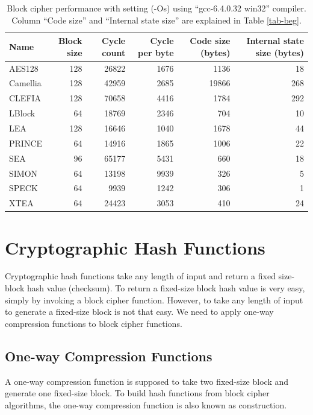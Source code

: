 \documentclass[sigconf, review=false]{acmart}
\begin{document}
\begin{table}[tbp]
\centering
\caption{Block cipher performance with setting (-Os) using ``gcc-6.4.0.32 win32'' compiler.
Column ``Code size'' and ``Internal state size'' are explained in Table \ref{tab-beg}.}
\label{tab-size}
\begin{tabular}{lrrrrr}
    \toprule
Name     & Block size & Cycle count & Cycle per byte & Code size (bytes) & Internal state size (bytes) \\
    \midrule
AES128   & 128        & 26822       & 1676           & 1136      & 18        \\
Camellia & 128        & 42959       & 2685           & 19866     & 268       \\
CLEFIA   & 128        & 70658       & 4416           & 1784      & 292       \\
LBlock   & 64         & 18769       & 2346           & 704       & 10        \\
LEA      & 128        & 16646       & 1040           & 1678      & 44        \\
PRINCE   & 64         & 14916       & 1865           & 1006      & 22        \\
SEA      & 96         & 65177       & 5431           & 660       & 18        \\
SIMON    & 64         & 13198       & 9939           & 326       & 5         \\
SPECK    & 64         & 9939        & 1242           & 306       & 1         \\
XTEA     & 64         & 24423       & 3053           & 410       & 24       \\
    \bottomrule
\end{tabular}
\end{table}


\section{Cryptographic Hash Functions}
Cryptographic hash functions take any length of input and return a fixed size-block hash value (checksum).
To return a fixed-size block hash value is very easy, simply by invoking a block cipher function.
However, to take any length of input to generate a fixed-size block is not that easy.
We need to apply one-way compression functions to block cipher functions.

\subsection{One-way Compression Functions} \label{sec-one}
A one-way compression function is supposed to take two fixed-size block and generate one fixed-size block.
To build hash functions from block cipher algorithms, the one-way compression function is also known as construction.
\end{document}
